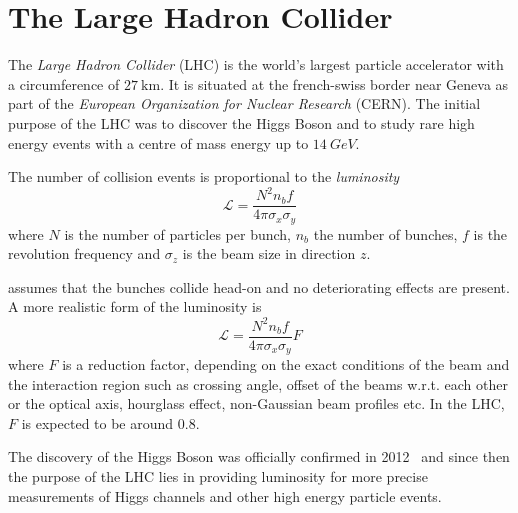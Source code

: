 \section{The Large Hadron Collider}

The \emph{Large Hadron Collider} (LHC) is the world's largest particle accelerator with a circumference
of $\SI{27}{\kilo\meter}$. It is situated at the french-swiss border near Geneva as part of the
\emph{European Organization for Nuclear Research} (CERN).
The initial purpose of the LHC was to discover the Higgs Boson and to study rare high energy events 
with a centre of mass energy up to $\SI{14}{GeV}$.

The number of collision events is proportional to the \emph{luminosity}
%
\begin{equation}
    \mathscr{L} = \frac{N^2 n_b f}{4\pi\sigma_x\sigma_y}
    \label{eq_lumi}
\end{equation}
%
where $N$ is the number of particles per bunch, $n_b$ the number of bunches, $f$ is
the revolution frequency and $\sigma_z$ is the beam size in direction $z$.

 assumes that the bunches collide head-on and no deteriorating effects are present. A more realistic form of the luminosity is~\cite{Herr2003}
%
\begin{equation}
    \mathscr{L} = \frac{N^2 n_b f}{4\pi\sigma_x\sigma_y} F
\end{equation}
%
where $F$ is a reduction factor, depending on the exact conditions of the beam and the interaction region such as crossing angle, offset of the beams w.r.t. each other or the optical axis, hourglass effect, non-Gaussian beam profiles etc. In the LHC, $F$ is expected to be around $0.8$. 

The discovery of the Higgs Boson was officially confirmed in 2012~\cite{higgs_1, higgs_2} and since then the
purpose of the LHC lies in providing luminosity for more precise measurements of Higgs channels and
other high energy particle events. 

